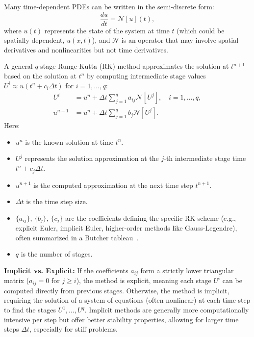 Many time-dependent PDEs can be written in the semi-discrete form:
%
\begin{equation}
\frac{du}{dt} = \mathcal{N}[u](t),
\label{eq:ode_form}
\end{equation}
%
where $u(t)$ represents the state of the system at time $t$ (which could be spatially dependent, $u(x,t)$), and $\mathcal{N}$ is an operator that may involve spatial derivatives and nonlinearities but not time derivatives.

A general $q$-stage Runge-Kutta (RK) method approximates the solution at $t^{n+1}$ based on the solution at $t^n$ by computing intermediate stage values $U^i \approx u(t^n + c_i \Delta t)$ for $i=1, \ldots, q$:
%
\begin{align}
    U^i &= u^n + \Delta t \sum_{j=1}^q a_{ij} \mathcal{N}[U^j], \quad i = 1, \ldots, q, \label{eq:rk_stages} \\
    u^{n+1} &= u^n + \Delta t \sum_{j=1}^q b_j \mathcal{N}[U^j]. \label{eq:rk_update}
\end{align}
%
Here:
\begin{itemize}
    \item $u^n$ is the known solution at time $t^n$.
    \item $U^j$ represents the solution approximation at the $j$-th intermediate stage time $t^n + c_j \Delta t$.
    \item $u^{n+1}$ is the computed approximation at the next time step $t^{n+1}$.
    \item $\Delta t$ is the time step size.
    \item $\{a_{ij}\}$, $\{b_j\}$, $\{c_j\}$ are the coefficients defining the specific RK scheme (e.g., explicit Euler, implicit Euler, higher-order methods like Gauss-Legendre), often summarized in a Butcher tableau~\cite{iserles2009first}.
    \item $q$ is the number of stages.
\end{itemize}
%
\textbf{Implicit vs. Explicit:} If the coefficients $a_{ij}$ form a strictly lower triangular matrix ($a_{ij}=0$ for $j \ge i$), the method is explicit, meaning each stage $U^i$ can be computed directly from previous stages. Otherwise, the method is implicit, requiring the solution of a system of equations (often nonlinear) at each time step to find the stages $U^1, \ldots, U^q$. Implicit methods are generally more computationally intensive per step but offer better stability properties, allowing for larger time steps $\Delta t$, especially for stiff problems.

